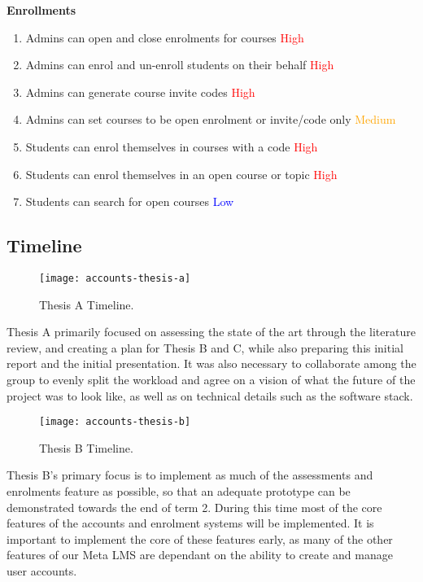 \textbf{Enrollments}
    \begin{enumerate}
    \item Admins can open and close enrolments for courses \textcolor{Red}{High}
    \item Admins can enrol and un-enroll students on their behalf \textcolor{Red}{High}
    \item Admins can generate course invite codes \textcolor{Red}{High}
    \item Admins can set courses to be open enrolment or invite/code only \textcolor{Orange}{Medium}
    \item Students can enrol themselves in courses with a code \textcolor{Red}{High}
    \item Students can enrol themselves in an open course or topic \textcolor{Red}{High}
    \item Students can search for open courses \textcolor{Blue}{Low}
    \end{enumerate}

\subsection{Timeline}

\begin{figure}[h!]
  \centering
  \texttt{[image: accounts-thesis-a]}
  \caption{Thesis A Timeline.}
\end{figure}
Thesis A primarily focused on assessing the state of the art through the literature review, and creating a plan for Thesis B and C, while also preparing this initial report and the initial presentation. It was also necessary to collaborate among the group to evenly split the workload and agree on a vision of what the future of the project was to look like, as well as on technical details such as the software stack.

\begin{figure}[h!]
    \centering
    \texttt{[image: accounts-thesis-b]}
    \caption{Thesis B Timeline.}
\end{figure}
Thesis B's primary focus is to implement as much of the assessments and enrolments feature as possible, so that an adequate prototype can be demonstrated towards the end of term 2. During this time most of the core features of the accounts and enrolment systems will be implemented. It is important to implement the core of these features early, as many of the other features of our Meta LMS are dependant on the ability to create and manage user accounts.

